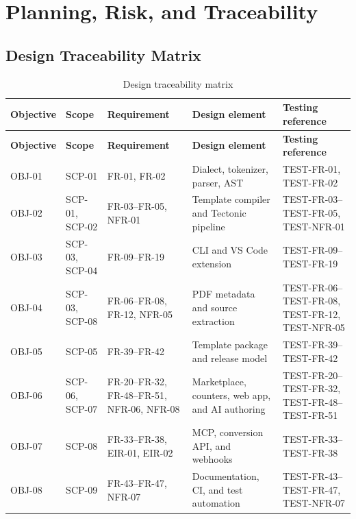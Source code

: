 
\chapter{Planning, Risk, and Traceability}
\label{chap:planning}

\section{Design Traceability Matrix}
\begin{xltabular}{\textwidth}{@{}p{0.09\textwidth}p{0.13\textwidth}p{0.21\textwidth}X p{0.18\textwidth}@{}}
\caption{Design traceability matrix}\label{tab:traceability}\\
\toprule
\textbf{Objective} & \textbf{Scope} & \textbf{Requirement} & \textbf{Design element} & \textbf{Testing reference} \\
\midrule
\endfirsthead
\toprule
\textbf{Objective} & \textbf{Scope} & \textbf{Requirement} & \textbf{Design element} & \textbf{Testing reference} \\
\midrule
\endhead
OBJ-01 & SCP-01 & FR-01, FR-02 & Dialect, tokenizer, parser, AST & TEST-FR-01, TEST-FR-02 \\
OBJ-02 & SCP-01, SCP-02 & FR-03--FR-05, NFR-01 & Template compiler and Tectonic pipeline & TEST-FR-03--TEST-FR-05, TEST-NFR-01 \\
OBJ-03 & SCP-03, SCP-04 & FR-09--FR-19 & CLI and VS Code extension & TEST-FR-09--TEST-FR-19 \\
OBJ-04 & SCP-03, SCP-08 & FR-06--FR-08, FR-12, NFR-05 & PDF metadata and source extraction & TEST-FR-06--TEST-FR-08, TEST-FR-12, TEST-NFR-05 \\
OBJ-05 & SCP-05 & FR-39--FR-42 & Template package and release model & TEST-FR-39--TEST-FR-42 \\
OBJ-06 & SCP-06, SCP-07 & FR-20--FR-32, FR-48--FR-51, NFR-06, NFR-08 & Marketplace, counters, web app, and AI authoring & TEST-FR-20--TEST-FR-32, TEST-FR-48--TEST-FR-51 \\
OBJ-07 & SCP-08 & FR-33--FR-38, EIR-01, EIR-02 & MCP, conversion API, and webhooks & TEST-FR-33--TEST-FR-38 \\
OBJ-08 & SCP-09 & FR-43--FR-47, NFR-07 & Documentation, CI, and test automation & TEST-FR-43--TEST-FR-47, TEST-NFR-07 \\
\bottomrule
\end{xltabular}

